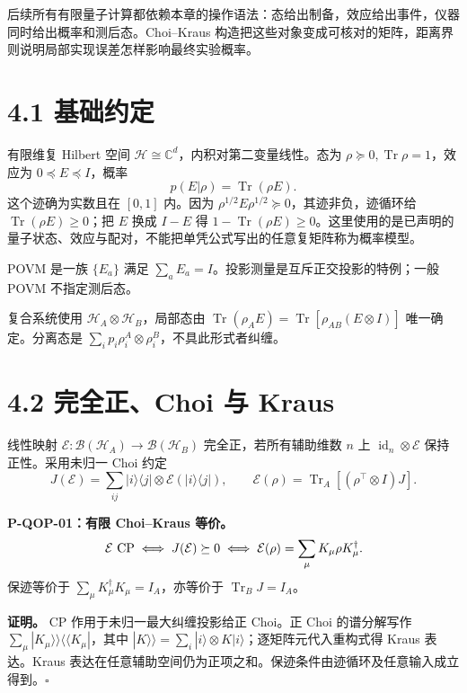 \documentclass[
  11pt,
  oneside]{book}
\begin{document}
后续所有有限量子计算都依赖本章的操作语法：态给出制备，效应给出事件，仪器同时给出概率和测后态。Choi--Kraus
构造把这些对象变成可核对的矩阵，距离界则说明局部实现误差怎样影响最终实验概率。

\section{4.1 基础约定}

有限维复 Hilbert 空间
\(\mathcal H\cong\mathbb C^d\)，内积对第二变量线性。态为
\(\rho\succeq0,\operatorname{Tr}\rho=1\)，效应为
\(0\preceq E\preceq I\)，概率 \[
p(E|\rho)=\operatorname{Tr}(\rho E).
\] 这个迹确为实数且在 \([0,1]\) 内。因为
\(\rho^{1/2}E\rho^{1/2}\succeq0\)，其迹非负，迹循环给
\(\operatorname{Tr}(\rho E)\ge0\)；把 \(E\) 换成 \(I-E\) 得
\(1-\operatorname{Tr}(\rho E)\ge0\)。这里使用的是已声明的量子状态、效应与配对，不能把单凭公式写出的任意复矩阵称为概率模型。

POVM 是一族 \(\{E_a\}\) 满足
\(\sum_aE_a=I\)。投影测量是互斥正交投影的特例；一般 POVM 不指定测后态。

复合系统使用 \(\mathcal H_A\otimes\mathcal H_B\)，局部态由
\(\operatorname{Tr}(\rho_AE)=\operatorname{Tr}[\rho_{AB}(E\otimes I)]\)
唯一确定。分离态是
\(\sum_i p_i\rho_i^A\otimes\rho_i^B\)，不具此形式者纠缠。

\section{4.2 完全正、Choi 与 Kraus}

线性映射
\(\mathcal E:\mathcal B(\mathcal H_A)\to\mathcal B(\mathcal H_B)\)
完全正，若所有辅助维数 \(n\) 上 \(\operatorname{id}_n\otimes\mathcal E\)
保持正性。采用未归一 Choi 约定 \[
J(\mathcal E)=\sum_{ij}|i\rangle\langle j|\otimes
\mathcal E(|i\rangle\langle j|),\qquad
\mathcal E(\rho)=\operatorname{Tr}_A[(\rho^\top\otimes I)J].
\]

\protect\hypertarget{p-qop-01}{}{}

\textbf{P-QOP-01：有限 Choi--Kraus 等价。} \[
\mathcal E\ {\rm CP}\iff J(\mathcal E)\succeq0
\iff\mathcal E(\rho)=\sum_\mu K_\mu\rho K_\mu^\dagger.
\] 保迹等价于 \(\sum_\mu K_\mu^\dagger K_\mu=I_A\)，亦等价于
\(\operatorname{Tr}_B J=I_A\)。

\textbf{证明。} CP 作用于未归一最大纠缠投影给正 Choi。正 Choi
的谱分解写作 \(\sum_\mu|K_\mu\rangle\rangle\langle\langle K_\mu|\)，其中
\(|K\rangle\rangle=\sum_i|i\rangle\otimes K|i\rangle\)；逐矩阵元代入重构式得
Kraus 表达。Kraus
表达在任意辅助空间仍为正项之和。保迹条件由迹循环及任意输入成立得到。\(\square\)
\end{document}
